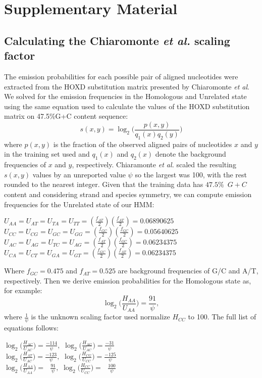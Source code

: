 \documentclass{llncs}
\begin{document}
\chapter*{Supplementary Material}
\section*{Calculating the Chiaromonte \textit{et al.} scaling factor}
The emission probabilities for
each possible pair of aligned nucleotides were extracted from the HOXD
substitution matrix presented by Chiaromonte \textit{et al}\cite{hoxd}.
We solved for the emission frequencies in the
Homologous and Unrelated state using the same equation used to
calculate the values of the HOXD substitution matrix on 47.5\%G+C
content sequence\cite{hoxd}:
\begin{equation}
s(x,y)= \log_{2}{\Bigg(\frac{p(x,y)}{q_{1}(x)q_{2}(y)}\Bigg)}
\end{equation}
{w}here $p(x,y)$ is the fraction of the observed aligned pairs of
nucleotides $x$ and $y$ in the training set used and $q_{1}(x)$ and
$q_{2}(x)$ denote the background frequencies of $x$ and $y$,
respectively. Chiaramonte \textit{et al.} scaled the resulting
$s(x,y)$ values by an unreported value $\psi$ so the largest was 100,
with the rest rounded to the nearest integer.  Given that the training
data has $47.5\%$~$G+C$ content and considering strand and species
symmetry, we can compute emission frequencies for the Unrelated state
of our HMM:
\begin{center}$U_{AA}=U_{AT}=U_{TA}=U_{TT}=(\frac{f_{AT}}{2})(\frac{f_{AT}}{2})
= 0.06890625$ \\
$U_{CC}=U_{CG}=U_{GC}=U_{GG}=(\frac{f_{GC}}{2})(\frac{f_{GC}}{2}) =
0.05640625$ \\
$U_{AC}=U_{AG}=U_{TC}=U_{AG}=(\frac{f_{AT}}{2})(\frac{f_{GC}}{2}) =
0.06234375$ \\
$U_{CA}=U_{CT}=U_{GA}=U_{GT}=(\frac{f_{GC}}{2})(\frac{f_{AT}}{2}) =
0.06234375$ \\
\end{center}

Where $f_{GC}=0.475$ and $f_{AT}=0.525$ are background frequencies of
G/C and A/T, respectively.  Then we derive emission probabilities for
the Homologous state as, for example:
\begin{equation}
\log_{2}\bigg(\frac{H_{AA}}{U_{AA}}\bigg) = \frac{91}{\psi},
\end{equation}
where $\frac{1}{\psi}$ is the unknown scaling factor used normalize $H_{CC}$ to 100. The full list of equations follows:
\begin{center}
$\log_{2}\bigg(\frac{H_{AC}}{U_{AC}}\bigg) = \frac{-114}{\psi},$
$\log_{2}\bigg(\frac{H_{AG}}{U_{AC}}\bigg) = \frac{-31}{\psi}$ \\
$\log_{2}\bigg(\frac{H_{AT}}{U_{AC}}\bigg) = \frac{-123}{\psi},$
$\log_{2}\bigg(\frac{H_{CG}}{U_{CC}}\bigg) = \frac{-125}{\psi}$ \\
$\log_{2}\bigg(\frac{H_{AA}}{U_{AA}}\bigg) = \ \ \ \frac{91}{\psi},$
$\log_{2}\bigg(\frac{H_{CC}}{U_{CC}}\bigg) = \ \ \ \frac{100}{\psi}$ \\
\end{center}
\end{document}
